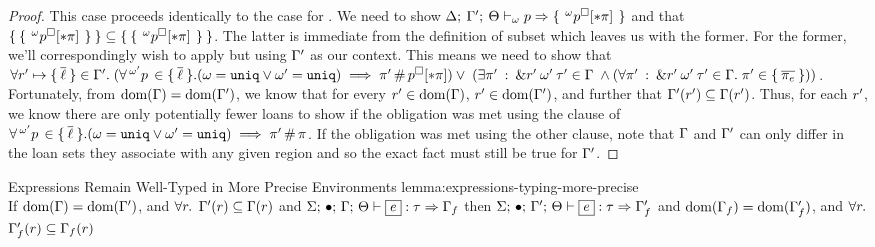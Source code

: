 \begin{proof}
  This case proceeds identically to the case for .
  We need to show $\Delta; \: \Gamma^\prime; \: \Theta \vdash_{\omega} p \Rightarrow 
    \{ \: \,^{\omega}p^\square[* \pi]\, \: \}
  $ and that
  $\{ \: 
    \{ \: \,^{\omega}p^\square[* \pi]\, \: \}
   \: \} \subseteq \{ \: 
    \{ \: \,^{\omega}p^\square[* \pi]\, \: \}
   \: \}$.
  The latter is immediate from the definition of subset which leaves us with the former.
  For the former, we'll correspondingly wish to apply  but using
  $\Gamma^\prime$ as our context. This means we need to show that
  $\forall r^\prime \mapsto \{ \: \overline{\ell} \: \} \in \Gamma^\prime.
  \; (\forall \,^{\omega^\prime}p\, \in \{ \: \overline{\ell} \: \}.
  (\omega = \mathtt{uniq} \vee \omega^\prime = \mathtt{uniq})
  \implies
  \pi^\prime \, \# \, p^\square[* \pi]) \vee \;
  (\exists \pi^\prime \: : \: \& r^\prime \: \omega^\prime \: \tau^\prime \in \Gamma \;
  \wedge
  (\forall \pi^\prime \: : \: \& r^\prime \: \omega^\prime \: \tau^\prime \in \Gamma. \;
  \pi^\prime \in \{ \: 
    \overline{\pi_e}
   \: \}))$. Fortunately, from $\textrm{dom}(\Gamma) = \textrm{dom}(\Gamma^\prime)$, we know that
  for every $r^\prime \in \textrm{dom}(\Gamma)$, $r^\prime \in
  \textrm{dom}(\Gamma^\prime)$, and further that $\Gamma^\prime(r^\prime)
  \subseteq \Gamma(r^\prime)$. Thus, for each $r^\prime$, we know there are only
  potentially fewer loans to show if the obligation was met using the clause of
  $\forall \,^{\omega^\prime}p\, \in \{ \: \overline{\ell} \: \}.
  (\omega = \mathtt{uniq} \vee \omega^\prime = \mathtt{uniq})
  \implies \pi^\prime \, \# \, \pi$. If the obligation was met using the other
  clause, note that $\Gamma$ and $\Gamma^\prime$ can only differ in the loan sets they
  associate with any given region and so the exact fact must still be true for
  $\Gamma^\prime$.
\end{proof}

\begin{oxlemma}{Expressions Remain Well-Typed in More Precise Environments}
  {lemma:expressions-typing-more-precise}\hfill\\ If $\textrm{dom}(\Gamma) =
  \textrm{dom}(\Gamma^\prime)$, and $\forall r.$ $\Gamma^\prime(r)
  \subseteq \Gamma(r)$ and 
  $\oxtypjudge{\oxglobalctx}{\oxemptyctx}{\oxkontctx}{\oxvarctx}
  {\oxexpr}{\oxtype}{\oxvarctx_f}$ then
  $\oxtypjudge{\oxglobalctx}{\oxemptyctx}{\oxkontctx}{\oxvarctx^\prime}
  {\oxexpr}{\oxtype}{\oxvarctx_f^\prime}$ and
  $\textrm{dom}(\Gamma_f) = \textrm{dom}(\Gamma_f^\prime)$, and
  $\forall r.$ $\Gamma_f^\prime(r) \subseteq \Gamma_f(r)$
\end{oxlemma}

